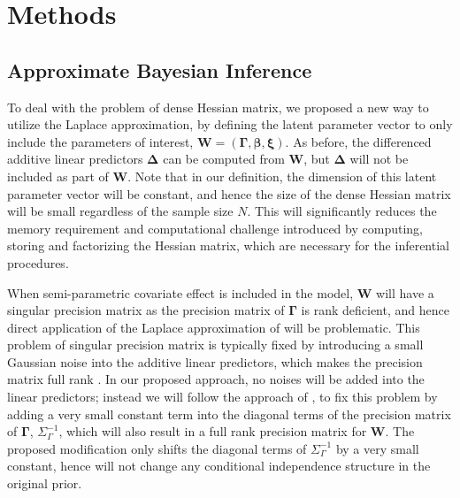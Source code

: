 \documentclass[ba]{imsart}
\begin{document}
\section{Methods}\label{sec:method}


\subsection{Approximate Bayesian Inference}\label{subsec:abi}


To deal with the problem of dense Hessian matrix, we proposed a new way to utilize the Laplace approximation, by defining the latent parameter vector to only include the parameters of interest, $\boldsymbol{W} = (\boldsymbol{\Gamma},\boldsymbol{\beta}, \boldsymbol{\xi})$. As before, the differenced additive linear predictors $\boldsymbol{\Delta}$ can be computed from $\boldsymbol{W}$, but $\boldsymbol{\Delta}$ will not be included as part of $\boldsymbol{W}$. Note that in our definition, the dimension of this latent parameter vector will be constant, and hence the size of the dense Hessian matrix will be small regardless of the sample size $N$. This will significantly reduces the memory requirement and computational challenge introduced by computing, storing and factorizing the Hessian matrix, which are necessary for the inferential procedures. 

When semi-parametric covariate effect is included in the model, $\boldsymbol{W}$ will have a singular precision matrix as the precision matrix of $\boldsymbol{\Gamma}$ is rank deficient, and hence direct application of the Laplace approximation of \cite{tierney} will be problematic. This problem of singular precision matrix is typically fixed by introducing a small Gaussian noise into the additive linear predictors, which makes the precision matrix full rank \citep{casecross, inla}. In our proposed approach, no noises will be added into the linear predictors; instead we will follow the approach of \cite{wood2011fast}, to fix this problem by adding a very small constant term into the diagonal terms of the precision matrix of $\boldsymbol{\Gamma}$, $\Sigma^{-1}_\Gamma$, which will also result in a full rank precision matrix for $\boldsymbol{W}$. 
The proposed modification only shifts the diagonal terms of $\Sigma^{-1}_\Gamma$ by a very small constant, hence will not change any conditional independence structure in the original prior.
\end{document}
